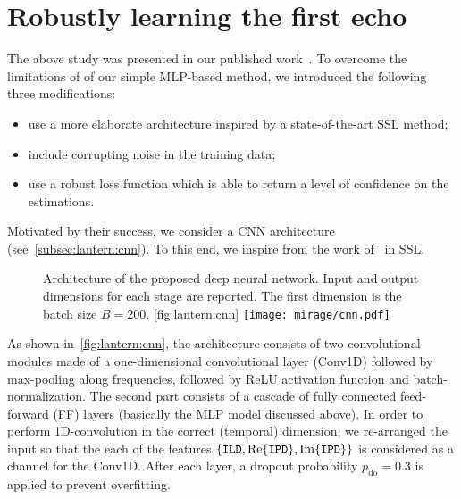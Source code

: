 \section{Robustly learning the first echo}\label{sec:lantern:robust}
The above study was presented in our published work~.
To overcome the limitations of of our simple \ac{MLP}-based method, we introduced the following three modifications:
\begin{itemize}
    \item use a more elaborate architecture inspired by a state-of-the-art SSL method;
    \item include corrupting noise in the training data;
    \item use a robust loss function which is able to return a level of confidence on the estimations.
\end{itemize}
Motivated by their success, we consider a \ac{CNN} architecture (see~\cref{subsec:lantern:cnn}).
To this end, we inspire from the work of~ in \ac{SSL}.
\begin{figure}[h]
    \begin{sidecaption}[CNN]{
        Architecture of the proposed deep neural network. Input and output dimensions for each stage are reported. The first dimension is the batch size $B = 200$.
        }[fig:lantern:cnn]
        \centering
        \texttt{[image: mirage/cnn.pdf]}
    \end{sidecaption}
\end{figure}
As shown in~\cref{fig:lantern:cnn}, the architecture consists of two convolutional modules made of a one-dimensional convolutional layer (Conv1D) followed by max-pooling along frequencies, followed by \ac{ReLU} activation function and batch-normalization.
The second part consists of a cascade of fully connected feed-forward (FF) layers (basically the \ac{MLP} model discussed above).
In order to perform 1D-convolution in the correct (temporal) dimension, we re-arranged the input so that the each of the features $\set{ \ild, \kRe\set{\ipd}, \kIm\set{\ipd}}$ is considered as a channel for the Conv1D.
After each layer, a dropout probability $p_\text{do} = 0.3$ is applied to prevent overfitting.

\mynewline
